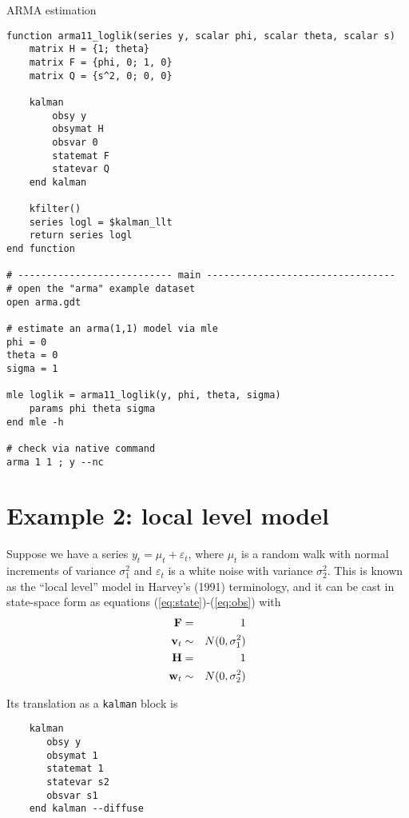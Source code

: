\documentclass[a4paper]{article}
\newcommand{\obsmat}{\ensuremath\mathbf{H}}
\newcommand{\obsdist}{\ensuremath\mathbf{w}}
\newcommand{\statemat}{\ensuremath\mathbf{F}}
\newcommand{\strdist}{\ensuremath\mathbf{v}}
\begin{document}
\begin{table}[htbp]
  \caption{ARMA estimation}
  \label{tab:armaest}

\begin{small}
\begin{verbatim}
function arma11_loglik(series y, scalar phi, scalar theta, scalar s)
    matrix H = {1; theta}
    matrix F = {phi, 0; 1, 0}
    matrix Q = {s^2, 0; 0, 0}

    kalman
        obsy y
        obsymat H
        obsvar 0
        statemat F
        statevar Q
    end kalman

    kfilter()
    series logl = $kalman_llt
    return series logl
end function

# --------------------------- main ---------------------------------
# open the "arma" example dataset
open arma.gdt 

# estimate an arma(1,1) model via mle
phi = 0
theta = 0
sigma = 1

mle loglik = arma11_loglik(y, phi, theta, sigma)
    params phi theta sigma
end mle -h

# check via native command 
arma 1 1 ; y --nc
\end{verbatim}
\end{small}
\end{table}

\section{Example 2: local level model}
\label{sec:example_loclev}

Suppose we have a series $y_t = \mu_t + \varepsilon_t$, where $\mu_t$
is a random walk with normal increments of variance $\sigma^2_1$ and $
\varepsilon_t$ is a white noise with variance $\sigma^2_2$.  This is
known as the ``local level'' model in Harvey's (1991) terminology, and
it can be cast in state-space form as equations
(\ref{eq:state})-(\ref{eq:obs}) with
\begin{eqnarray*}
  \statemat & = & 1 \\
  \strdist_t & \sim & N(0, \sigma^2_1) \\
  \obsmat & = & 1 \\
  \obsdist_t & \sim & N(0, \sigma^2_2)
\end{eqnarray*}

Its translation as a \texttt{kalman} block is
\begin{verbatim}
    kalman
       obsy y
       obsymat 1
       statemat 1
       statevar s2
       obsvar s1
    end kalman --diffuse
\end{verbatim}
\end{document}
